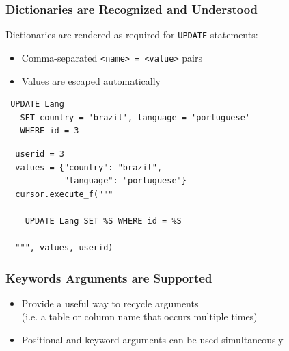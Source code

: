 \documentclass{beamer}
\begin{document}
\begin{frame}[fragile]
  \frametitle{Dictionaries are Recognized and Understood}

  Dictionaries are rendered as required for \texttt{UPDATE} statements:
  \begin{itemize}
  \item Comma-separated \texttt{<name> = <value>} pairs
  \item Values are escaped automatically
  \end{itemize}

{\small
\begin{verbatim}
 UPDATE Lang
   SET country = 'brazil', language = 'portuguese'
   WHERE id = 3
\end{verbatim}
\vfill

\begin{verbatim}
  userid = 3
  values = {"country": "brazil",
            "language": "portuguese"}
  cursor.execute_f("""

    UPDATE Lang SET %S WHERE id = %S

  """, values, userid)
\end{verbatim}
}

\end{frame}


\begin{frame}[fragile]
  \frametitle{Keywords Arguments are Supported}


\begin{itemize}
\item Provide a useful way to recycle arguments \\
(i.e. a table or column name that occurs multiple times)

\item Positional and keyword arguments can be used simultaneously
\end{itemize}

\end{frame}
\end{document}
